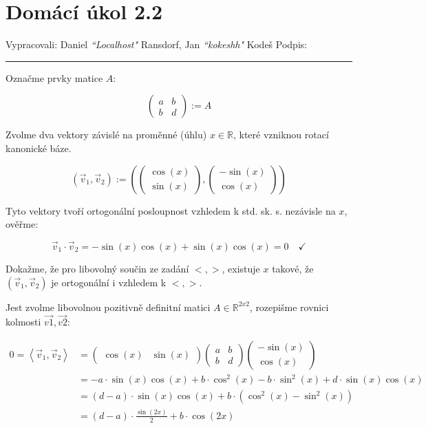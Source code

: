\documentclass[12pt]{article}
\begin{document}
\section*{Domácí úkol 2.2}

Vypracovali: Daniel \textit{``Localhost"} Ransdorf, Jan \textit{``kokeshh"} Kodeš \hfill Podpis: \rule{4cm}{0.4pt}


\bigskip

Označme prvky matice $A$:

\[
  \left(\begin{array}{cc}
    a & b \\ b & d
  \end{array}\right) := A
\]

Zvolme dva vektory závislé na proměnné (úhlu) $x\in\mathbb{R}$, které vzniknou rotací kanonické báze.


\[
  \left(\vec{v}_1, \vec{v}_2\right) := \left(
    \left(\begin{array}{c}
      \cos(x) \\ \sin(x)
    \end{array}\right),
    \left(\begin{array}{c}
      -\sin(x) \\ \cos(x)
    \end{array}\right)
  \right)
\]

Tyto vektory tvoří ortogonální posloupnost vzhledem k std. sk. s. nezávisle na $x$, ověřme:

\[
  \vec{v}_1 \cdot \vec{v}_2 = -\sin(x)\cos(x) + \sin(x)\cos(x) = 0 \quad \checkmark
\]

Dokažme, že pro libovolný součin ze zadání $<,>$, existuje $x$ takové, že $(\vec{v}_1,\vec{v}_2)$ je
ortogonální i vzhledem k $<,>$.

Jest zvolme libovolnou pozitivně definitní matici $A \in \mathbb{R}^{2x2}$,
rozepišme rovnici kolmosti $\vec{v1},\vec{v2}$:

\begin{align*}
  0 = \left<\vec{v}_1, \vec{v}_2\right>
  &= \left(\begin{array}{cc}
      \cos(x) & \sin(x)
    \end{array}\right)
    \left(\begin{array}{cc}
      a & b \\ b & d
    \end{array}\right)
    \left(\begin{array}{c}
      -\sin(x) \\ \cos(x)
    \end{array}\right) \\
  &= -a\cdot \sin(x)\cos(x) + b\cdot \cos^2(x) - b\cdot \sin^2(x) + d\cdot \sin(x)\cos(x) \\
  &= (d-a)\cdot \sin(x)\cos(x) + b\cdot(\cos^2(x) - \sin^2(x)) \\
  &= (d-a)\cdot \frac{\sin(2x)}{2} + b\cdot \cos(2x)
\end{align*}
\end{document}
